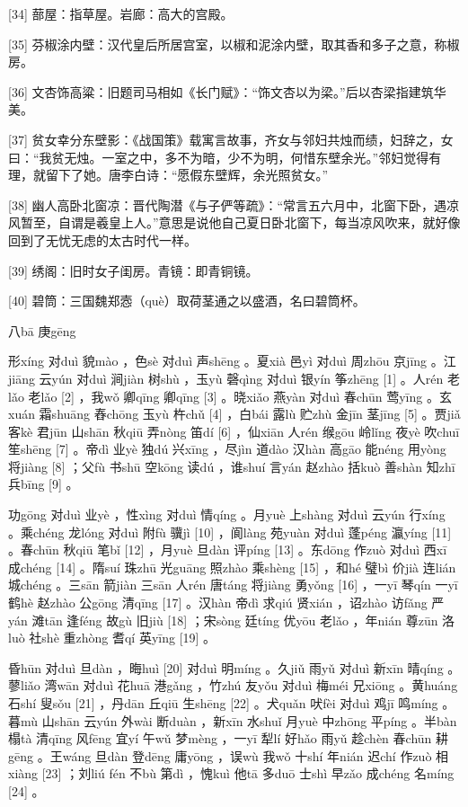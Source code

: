 \documentclass[12pt,UTF8]{ctexbook}
\begin{document}
[34] 蔀屋：指草屋。岩廊：高大的宫殿。

[35] 芬椒涂内壁：汉代皇后所居宫室，以椒和泥涂内壁，取其香和多子之意，称椒房。

[36] 文杏饰高粱：旧题司马相如《长门赋》：“饰文杏以为梁。”后以杏梁指建筑华美。

[37] 贫女幸分东壁影：《战国策》载寓言故事，齐女与邻妇共烛而绩，妇辞之，女曰：“我贫无烛。一室之中，多不为暗，少不为明，何惜东壁余光。”邻妇觉得有理，就留下了她。唐李白诗：“愿假东壁辉，余光照贫女。”

[38] 幽人高卧北窗凉：晋代陶潜《与子俨等疏》：“常言五六月中，北窗下卧，遇凉风暂至，自谓是羲皇上人。”意思是说他自己夏日卧北窗下，每当凉风吹来，就好像回到了无忧无虑的太古时代一样。

[39] 绣阁：旧时女子闺房。青镜：即青铜镜。

[40] 碧筒：三国魏郑悫（què）取荷茎通之以盛酒，名曰碧筒杯。





八bā 庚gēng


形xíng 对duì 貌mào ，色sè 对duì 声shēng 。夏xià 邑yì 对duì 周zhōu 京jīng 。江jiāng 云yún 对duì 涧jiàn 树shù ，玉yù 磬qìng 对duì 银yín 筝zhēng [1] 。人rén 老lǎo 老lǎo [2] ，我wǒ 卿qīng 卿qīng [3] 。晓xiǎo 燕yàn 对duì 春chūn 莺yīng 。玄xuán 霜shuāng 舂chōng 玉yù 杵chǔ [4] ，白bái 露lù 贮zhù 金jīn 茎jīng [5] 。贾jiǎ 客kè 君jūn 山shān 秋qiū 弄nòng 笛dí [6] ，仙xiān 人rén 缑gōu 岭lǐng 夜yè 吹chuī 笙shēng [7] 。帝dì 业yè 独dú 兴xīng ，尽jìn 道dào 汉hàn 高gāo 能néng 用yòng 将jiàng [8] ；父fù 书shū 空kōng 读dú ，谁shuí 言yán 赵zhào 括kuò 善shàn 知zhī 兵bīng [9] 。

功gōng 对duì 业yè ，性xìng 对duì 情qíng 。月yuè 上shàng 对duì 云yún 行xíng 。乘chéng 龙lóng 对duì 附fù 骥jì [10] ，阆làng 苑yuàn 对duì 蓬péng 瀛yíng [11] 。春chūn 秋qiū 笔bǐ [12] ，月yuè 旦dàn 评píng [13] 。东dōng 作zuò 对duì 西xī 成chéng [14] 。隋suí 珠zhū 光guāng 照zhào 乘shèng [15] ，和hé 璧bì 价jià 连lián 城chéng 。三sān 箭jiàn 三sān 人rén 唐táng 将jiàng 勇yǒng [16] ，一yī 琴qín 一yī 鹤hè 赵zhào 公gōng 清qīng [17] 。汉hàn 帝dì 求qiú 贤xián ，诏zhào 访fǎng 严yán 滩tān 逢féng 故gù 旧jiù [18] ；宋sòng 廷tíng 优yōu 老lǎo ，年nián 尊zūn 洛luò 社shè 重zhòng 耆qí 英yīng [19] 。

昏hūn 对duì 旦dàn ，晦huì [20] 对duì 明míng 。久jiǔ 雨yǔ 对duì 新xīn 晴qíng 。蓼liǎo 湾wān 对duì 花huā 港gǎng ，竹zhú 友yǒu 对duì 梅méi 兄xiōng 。黄huáng 石shí 叟sǒu [21] ，丹dān 丘qiū 生shēng [22] 。犬quǎn 吠fèi 对duì 鸡jī 鸣míng 。暮mù 山shān 云yún 外wài 断duàn ，新xīn 水shuǐ 月yuè 中zhōng 平píng 。半bàn 榻tà 清qīng 风fēng 宜yí 午wǔ 梦mèng ，一yī 犁lí 好hǎo 雨yǔ 趁chèn 春chūn 耕gēng 。王wáng 旦dàn 登dēng 庸yōng ，误wù 我wǒ 十shí 年nián 迟chí 作zuò 相xiàng [23] ；刘liú fén 不bù 第dì ，愧kuì 他tā 多duō 士shì 早zǎo 成chéng 名míng [24] 。
\end{document}
